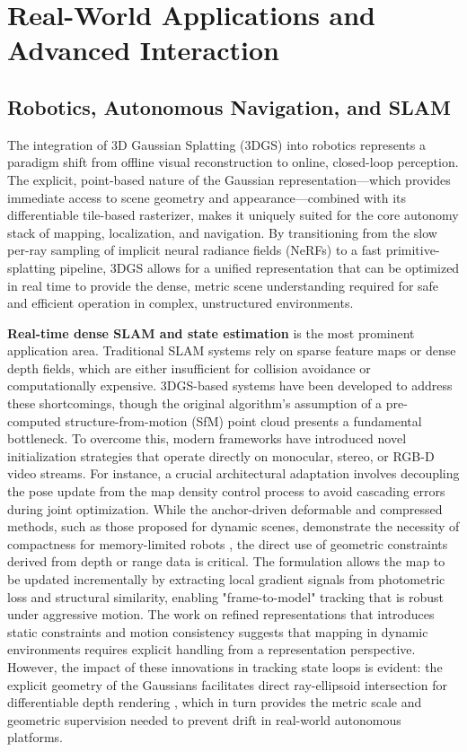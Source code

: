 \documentclass[11pt,a4paper]{article}
\begin{document}
\section{Real-World Applications and Advanced Interaction}



\subsection{Robotics, Autonomous Navigation, and SLAM}


The integration of 3D Gaussian Splatting (3DGS) into robotics represents a paradigm shift from offline visual reconstruction to online, closed-loop perception. The explicit, point-based nature of the Gaussian representation---which provides immediate access to scene geometry and appearance---combined with its differentiable tile-based rasterizer, makes it uniquely suited for the core autonomy stack of mapping, localization, and navigation. By transitioning from the slow per-ray sampling of implicit neural radiance fields (NeRFs) \cite{arxiv:2402.07181v1,arxiv:2401.03890v2} to a fast primitive-splatting pipeline, 3DGS allows for a unified representation that can be optimized in real time to provide the dense, metric scene understanding required for safe and efficient operation in complex, unstructured environments.

\textbf{Real-time dense SLAM and state estimation} is the most prominent application area. Traditional SLAM systems rely on sparse feature maps or dense depth fields, which are either insufficient for collision avoidance or computationally expensive. 3DGS-based systems have been developed to address these shortcomings, though the original algorithm's assumption of a pre-computed structure-from-motion (SfM) point cloud presents a fundamental bottleneck. To overcome this, modern frameworks \cite{arxiv:2401.03890v2,arxiv:2510.26694v1} have introduced novel initialization strategies that operate directly on monocular, stereo, or RGB-D video streams. For instance, a crucial architectural adaptation involves decoupling the pose update from the map density control process to avoid cascading errors during joint optimization. While the anchor-driven deformable and compressed methods, such as those proposed for dynamic scenes, demonstrate the necessity of compactness for memory-limited robots \cite{arxiv:2505.08196v1,arxiv:2408.03822v1}, the direct use of geometric constraints derived from depth or range data is critical. The formulation allows the map to be updated incrementally by extracting local gradient signals from photometric loss and structural similarity, enabling "frame-to-model" tracking that is robust under aggressive motion. The work on refined representations \cite{arxiv:2405.17891v1} that introduces static constraints and motion consistency suggests that mapping in dynamic environments requires explicit handling from a representation perspective. However, the impact of these innovations in tracking state loops is evident: the explicit geometry of the Gaussians facilitates direct ray-ellipsoid intersection for differentiable depth rendering \cite{arxiv:2510.12174v2}, which in turn provides the metric scale and geometric supervision needed to prevent drift in real-world autonomous platforms.
\end{document}
